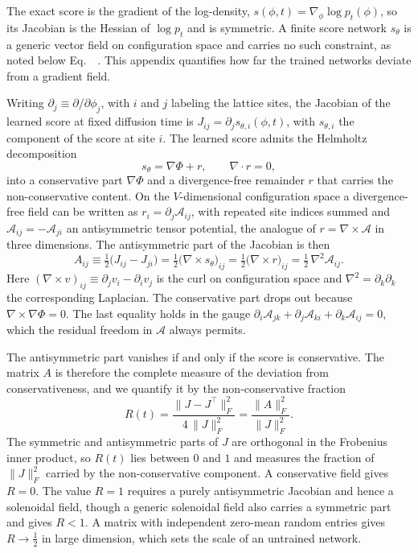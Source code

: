 \documentclass[reprint,twocolumn,superscriptaddress,preprintnumbers,amsmath,amssymb,aps,prd,floatfix]{revtex4-2}
\def\Eq#1{Eq.~\labelcref{#1}} \def\Eqs#1{Eqs.~\labelcref{#1}}
\begin{document}
The exact score is the gradient of the log-density, $s(\phi,t)=\nabla_\phi\log p_t(\phi)$, so its Jacobian is the Hessian of $\log p_t$ and is symmetric. A finite score network $s_\theta$ is a generic vector field on configuration space and carries no such constraint, as noted below \Eq{eq:score_small_t}~\cite{Aarts:2025lpi}. This appendix quantifies how far the trained networks deviate from a gradient field.

Writing $\partial_j\equiv\partial/\partial\phi_j$, with $i$ and $j$ labeling the lattice sites, the Jacobian of the learned score at fixed diffusion time is $J_{ij}=\partial_j s_{\theta,i}(\phi,t)$, with $s_{\theta,i}$ the component of the score at site $i$. The learned score admits the Helmholtz decomposition
\begin{equation}
s_\theta=\nabla\Phi+r,\qquad \nabla\cdot r=0,
\end{equation}
into a conservative part $\nabla\Phi$ and a divergence-free remainder $r$ that carries the non-conservative content. On the $V$-dimensional configuration space a divergence-free field can be written as $r_i=\partial_j\mathcal{A}_{ij}$, with repeated site indices summed and $\mathcal{A}_{ij}=-\mathcal{A}_{ji}$ an antisymmetric tensor potential, the analogue of $r=\nabla\times\mathcal{A}$ in three dimensions. The antisymmetric part of the Jacobian is then
\begin{equation}
A_{ij}\equiv\tfrac12\bigl(J_{ij}-J_{ji}\bigr)
=\tfrac12\bigl(\nabla\times s_\theta\bigr)_{ij}
=\tfrac12\bigl(\nabla\times r\bigr)_{ij}
=\tfrac12\,\nabla^2\mathcal{A}_{ij}.
\label{eq:antisym_curl}
\end{equation}
Here $(\nabla\times v)_{ij}\equiv\partial_j v_i-\partial_i v_j$ is the curl on configuration space and $\nabla^2=\partial_k\partial_k$ the corresponding Laplacian. The conservative part drops out because $\nabla\times\nabla\Phi=0$. The last equality holds in the gauge $\partial_i\mathcal{A}_{jk}+\partial_j\mathcal{A}_{ki}+\partial_k\mathcal{A}_{ij}=0$, which the residual freedom in $\mathcal{A}$ always permits.

The antisymmetric part vanishes if and only if the score is conservative. The matrix $A$ is therefore the complete measure of the deviation from conservativeness, and we quantify it by the non-conservative fraction
\begin{equation}
R(t)=\frac{\lVert J-J^\top\rVert_F^2}{4\,\lVert J\rVert_F^2}=\frac{\lVert A\rVert_F^2}{\lVert J\rVert_F^2}.
\label{eq:nonconserved_fraction}
\end{equation}
The symmetric and antisymmetric parts of $J$ are orthogonal in the Frobenius inner product, so $R(t)$ lies between $0$ and $1$ and measures the fraction of $\lVert J\rVert_F^2$ carried by the non-conservative component. A conservative field gives $R=0$. The value $R=1$ requires a purely antisymmetric Jacobian and hence a solenoidal field, though a generic solenoidal field also carries a symmetric part and gives $R<1$. A matrix with independent zero-mean random entries gives $R\to\tfrac12$ in large dimension, which sets the scale of an untrained network.
\end{document}
